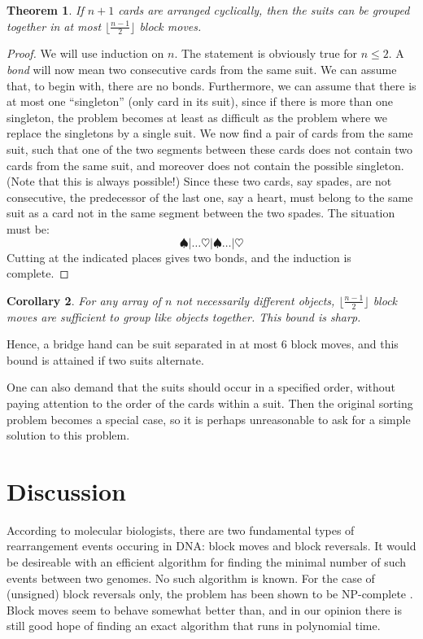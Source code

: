 \documentclass[11pt]{amsart} %
\newtheorem{theorem}{Theorem}[section]
\newtheorem{corollary}[theorem]{Corollary}
\begin{document}
\begin{theorem}
If $n+1$ cards are arranged cyclically, then the suits can be
grouped together in at most $\lfloor \frac{n-1}{2} \rfloor$ block
moves.
\end{theorem}
\begin{proof}
We will use induction on $n$. The statement is obviously true for
$n\leq 2$. A \emph{bond} will now mean two consecutive cards from
the same suit. We can assume that, to begin with, there are no
bonds. Furthermore, we can assume that there is at most one
``singleton'' (only card in its suit),
 since if there is more than one singleton, the problem
becomes at least as difficult
as the problem where
we replace the singletons by a single suit.
We now find a pair of cards from the same suit, such
that one of the two segments between these cards does not contain
two cards from the same suit, and moreover does not contain the
possible singleton. (Note that this is always possible!) Since
these two cards, say spades, are not consecutive, the predecessor
of the last one, say a heart, must belong to the same suit as a
card not in the same segment between the two spades. The situation
must be:
\[
\spadesuit |\dots \heartsuit |\spadesuit \dots |\heartsuit
\]
Cutting at the indicated places gives two bonds, and the induction
is complete.
\end{proof}

\begin{corollary}
For any array of $n$ not necessarily different objects,  
$\lfloor \frac{n-1}{2} \rfloor$
block moves are sufficient to group like objects together. This bound is sharp.
\end{corollary}\noindent
Hence, a bridge hand can be suit separated in at
most 6 block moves, and this bound is attained if two suits
alternate.

One can also demand that the suits should occur in a specified
order, without paying attention to the order of the cards within a
suit. Then the original sorting problem becomes a special case, so
it is perhaps unreasonable to ask for a simple solution to this
problem.

\section{Discussion}
According to molecular biologists, there are two fundamental types 
of rearrangement events occuring in DNA: block moves and block reversals.
It would be desireable with an efficient algorithm for finding the 
minimal number of such events between two genomes.  No such algorithm is
known.  For the case of (unsigned) block reversals only, the
problem has been shown to be NP-complete \cite{C}.
Block moves seem to behave somewhat better than, and in our opinion
there is still good hope of finding an exact algorithm that runs in polynomial
time.
\end{document}
